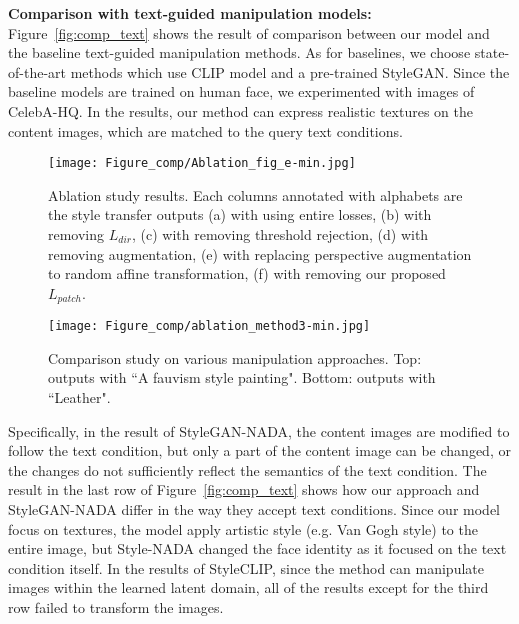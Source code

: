 \documentclass[10pt,twocolumn,letterpaper]{article}
\begin{document}
\noindent\textbf{Comparison with text-guided manipulation models:} 
Figure~\ref{fig:comp_text} shows the result of comparison between our model and the baseline text-guided manipulation methods. As for baselines, we choose state-of-the-art methods which use CLIP model and a pre-trained StyleGAN. Since the baseline models are trained on human face, we experimented with images of CelebA-HQ\cite{celeba}. In the results, our method can express realistic textures on the content images, which are matched to the query text conditions. 

\begin{figure*}[!t]

\centering
\texttt{[image: Figure\_comp/Ablation\_fig\_e-min.jpg]}
\vspace*{-0.5cm}
\caption{Ablation study results. Each columns annotated with alphabets are the style transfer outputs (a) with using entire losses, (b) with removing $L_{dir}$, (c) with removing threshold rejection, (d) with removing augmentation, (e) with replacing perspective augmentation to random affine transformation, (f) with removing our proposed $L_{patch}$.
}
\label{fig:ablation}
\end{figure*}

\begin{figure}[!t]

\centering
\vspace*{-0.5cm}
\texttt{[image: Figure\_comp/ablation\_method3-min.jpg]}
\vspace*{-0.5cm}
\caption{Comparison study on various manipulation approaches. Top: outputs with ``A fauvism style painting". Bottom: outputs with ``Leather".
}
\vspace*{-0.5cm}
\label{fig:ablation_m}
\end{figure}



Specifically, in the result of StyleGAN-NADA\cite{nada}, the content images are modified to follow the text condition, but  only a part of the content image can be changed, or the changes do not sufficiently reflect the semantics of the text condition. The result in the last row of Figure~\ref{fig:comp_text} shows how our approach and StyleGAN-NADA differ in the way they accept text conditions. Since our model focus on textures, the model apply artistic style (e.g. Van Gogh style) to the entire image, but Style-NADA changed the face identity as it focused on the text condition itself.
In the results of StyleCLIP\cite{styleclip}, since the method can manipulate images within the learned latent domain, all of the results except for the third row failed to transform the images. 
\end{document}
